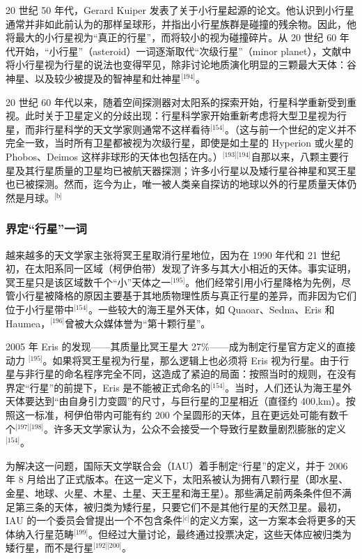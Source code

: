 20 世纪 50 年代，Gerard Kuiper 发表了关于小行星起源的论文。他认识到小行星通常并非如此前认为的那样呈球形，并指出小行星族群是碰撞的残余物。因此，他将最大的小行星视为“真正的行星”，而将较小的视为碰撞碎片。从 20 世纪 60 年代开始，“小行星”（asteroid）一词逐渐取代“次级行星”（minor planet），文献中将小行星视为行星的说法也变得罕见，除非讨论地质演化明显的三颗最大天体：谷神星、以及较少被提及的智神星和灶神星\(^\text{[194]}\)。

20 世纪 60 年代以来，随着空间探测器对太阳系的探索开始，行星科学重新受到重视。此时关于卫星定义的分歧出现：行星科学家开始重新考虑将大型卫星视为行星，而非行星科学的天文学家则通常不这样看待\(^\text{[154]}\)。（这与前一个世纪的定义并不完全一致，当时所有卫星都被视为次级行星，即使是如土星的 Hyperion 或火星的 Phobos、Deimos 这样非球形的天体也包括在内。）\(^\text{[193][194]}\)自那以来，八颗主要行星及其行星质量的卫星均已被航天器探测；许多小行星以及矮行星谷神星和冥王星也已被探测。然而，迄今为止，唯一被人类亲自探访的地球以外的行星质量天体仍然是月球。\(^\text{[b]}\)
\subsubsection{界定“行星”一词}
越来越多的天文学家主张将冥王星取消行星地位，因为在 1990 年代和 21 世纪初，在太阳系同一区域（柯伊伯带）发现了许多与其大小相近的天体。事实证明，冥王星只是该区域数千个“小”天体之一\(^\text{[195]}\)。他们经常引用小行星降格为先例，尽管小行星被降格的原因主要基于其地质物理性质与真正行星的差异，而非因为它们位于小行星带中\(^\text{[154]}\)。一些较大的海王星外天体，如 Quaoar、Sedna、Eris 和 Haumea，\(^\text{[196]}\)曾被大众媒体誉为“第十颗行星”。

2005 年 Eris 的发现——其质量比冥王星大 27\%——成为制定行星官方定义的直接动力 \(^\text{[195]}\)。如果将冥王星视为行星，那么逻辑上也必须将 Eris 视为行星。由于行星与非行星的命名程序完全不同，这造成了紧迫的局面：按照当时的规则，在没有界定“行星”的前提下，Eris 是不能被正式命名的\(^\text{[154]}\)。当时，人们还认为海王星外天体要达到“由自身引力变圆”的尺寸，与巨行星的卫星相近（直径约 400,km）。按照这一标准，柯伊伯带内可能有约 200 个呈圆形的天体，且在更远处可能有数千个\(^\text{[197][198]}\)。许多天文学家认为，公众不会接受一个导致行星数量剧烈膨胀的定义\(^\text{[154]}\)。

为解决这一问题，国际天文学联合会（IAU）着手制定“行星”的定义，并于 2006 年 8 月给出了正式版本。在这一定义下，太阳系被认为拥有八颗行星（即水星、金星、地球、火星、木星、土星、天王星和海王星）。那些满足前两条条件但不满足第三条的天体，被归类为矮行星，只要它们不是其他行星的天然卫星。最初，IAU 的一个委员会曾提出一个不包含条件\(^\text{[c]}\)的定义方案，这一方案本会将更多的天体纳入行星范畴\(^\text{[199]}\)。但经过大量讨论，最终通过投票决定，这些天体应被归类为矮行星，而不是行星\(^\text{[192][200]}\)。

